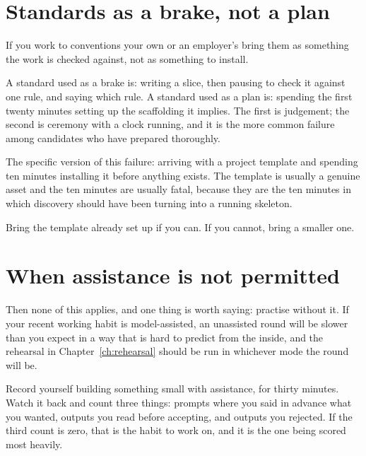 
\section{Standards as a brake, not a plan}

If you work to conventions \dash{} your own or an employer's \dash{} bring them
as something the work is checked against, not as something to install.

A standard used as a brake is: writing a slice, then pausing to check it
against one rule, and saying which rule. A standard used as a plan is: spending
the first twenty minutes setting up the scaffolding it implies. The first is
judgement; the second is ceremony with a clock running, and it is the more
common failure among candidates who have prepared thoroughly.

\begin{kittrap}
The specific version of this failure: arriving with a project template and
spending ten minutes installing it before anything exists. The template is
usually a genuine asset and the ten minutes are usually fatal, because they are
the ten minutes in which discovery should have been turning into a running
skeleton.

Bring the template already set up if you can. If you cannot, bring a smaller
one.
\end{kittrap}

\section{When assistance is not permitted}

Then none of this applies, and one thing is worth saying: practise without it.
If your recent working habit is model-assisted, an unassisted round will be
slower than you expect in a way that is hard to predict from the inside, and
the rehearsal in Chapter~\ref{ch:rehearsal} should be run in whichever mode the
round will be.

\begin{drill}
Record yourself building something small with assistance, for thirty minutes.
Watch it back and count three things: prompts where you said in advance what
you wanted, outputs you read before accepting, and outputs you rejected. If the
third count is zero, that is the habit to work on, and it is the one being
scored most heavily.
\end{drill}

